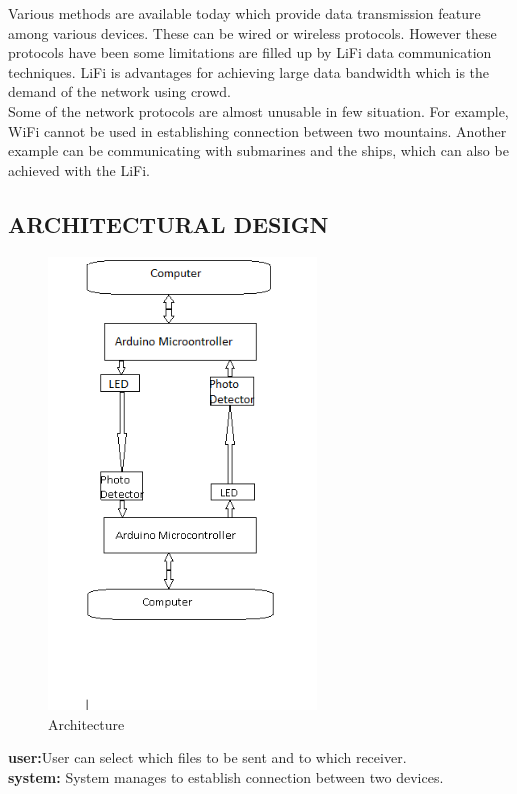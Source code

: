 \documentclass[12pt,a4paper]
{article}
\numberwithin{table}{section}
\begin{document}
{{{{{{{\hspace{10 pt}Various methods are available today which provide data transmission feature among various devices. These can be wired or wireless protocols. However these protocols have been some limitations are filled up by LiFi data communication techniques. LiFi is advantages for achieving large data bandwidth which is the demand of the network using crowd.\\

\hspace{10 pt}Some of the network protocols are almost unusable in few situation. For example, WiFi cannot be used in establishing connection between two mountains. Another example can be communicating with submarines and the ships, which can also be achieved with the LiFi.
\subsection{ARCHITECTURAL DESIGN}
\begin{center}
	  \begin{figure}[h]
			\centering
			\includegraphics[width=9 cm , height= 12cm]{archi.png}
			\caption{Architecture}
		\end{figure}
	\end{center}
	
\textbf{user:}User can select which files to be sent and to which receiver.\\
\textbf{system: }System manages to establish connection between two devices.\\

}}}}}}}
\end{document}
